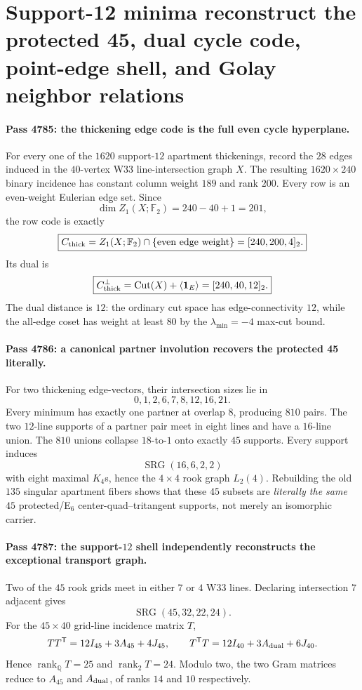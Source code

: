 \section*{Support-12 minima reconstruct the protected 45, dual cycle code, point-edge shell, and Golay neighbor relations}

\paragraph{Pass 4785: the thickening edge code is the full even cycle hyperplane.}
For every one of the $1620$ support-$12$ apartment thickenings, record the $28$ edges induced in the $40$-vertex W33 line-intersection graph $X$.  The resulting $1620\times240$ binary incidence has constant column weight $189$ and rank $200$.  Every row is an even-weight Eulerian edge set.  Since
\[
\dim Z_1(X;\mathbb F_2)=240-40+1=201,
\]
the row code is exactly
\[
\boxed{C_{\rm thick}=Z_1(X;\mathbb F_2)\cap\{\text{even edge weight}\}=[240,200,4]_2.}
\]
Its dual is
\[
\boxed{C_{\rm thick}^{\perp}=\operatorname{Cut}(X)+\langle\mathbf1_E\rangle=[240,40,12]_2.}
\]
The dual distance is $12$: the ordinary cut space has edge-connectivity $12$, while the all-edge coset has weight at least $80$ by the $\lambda_{\min}=-4$ max-cut bound.

\paragraph{Pass 4786: a canonical partner involution recovers the protected 45 literally.}
For two thickening edge-vectors, their intersection sizes lie in
\[
0,1,2,6,7,8,12,16,21.
\]
Every minimum has exactly one partner at overlap $8$, producing $810$ pairs.  The two $12$-line supports of a partner pair meet in eight lines and have a $16$-line union.  The $810$ unions collapse $18$-to-$1$ onto exactly $45$ supports.  Every support induces
\[
\operatorname{SRG}(16,6,2,2)
\]
with eight maximal $K_4$s, hence the $4\times4$ rook graph $L_2(4)$.  Rebuilding the old $135$ singular apartment fibers shows that these $45$ subsets are \emph{literally the same} $45$ protected/E$_6$ center-quad--tritangent supports, not merely an isomorphic carrier.

\paragraph{Pass 4787: the support-$12$ shell independently reconstructs the exceptional transport graph.}
Two of the $45$ rook grids meet in either $7$ or $4$ W33 lines.  Declaring intersection $7$ adjacent gives
\[
\boxed{\operatorname{SRG}(45,32,22,24).}
\]
For the $45\times40$ grid-line incidence matrix $T$,
\[
TT^{\mathsf T}=12I_{45}+3A_{45}+4J_{45},
\qquad
T^{\mathsf T}T=12I_{40}+3A_{\rm dual}+6J_{40}.
\]
Hence $\operatorname{rank}_{\mathbb Q}T=25$ and $\operatorname{rank}_{2}T=24$.  Modulo two, the two Gram matrices reduce to $A_{45}$ and $A_{\rm dual}$, of ranks $14$ and $10$ respectively.

